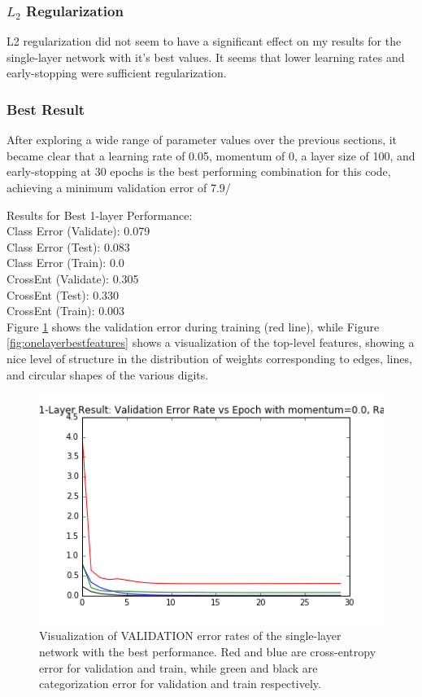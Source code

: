 \documentclass{article}
\begin{document}
\subsubsection*{$L_2$ Regularization}
L2 regularization did not seem to have a significant effect on my results for the single-layer network with it's best values. It seems that lower learning rates and early-stopping were sufficient regularization. 

\subsubsection*{Best Result}
After exploring a wide range of parameter values over the previous sections, it became clear that a learning rate of 0.05, momentum of 0, a layer size of 100, and early-stopping at 30 epochs is the best performing combination for this code, achieving a minimum validation error of 7.9/%

Results for Best 1-layer Performance:\\
Class Error (Validate): 0.079\\
Class Error (Test):		0.083\\
Class Error (Train):	0.0\\
CrossEnt (Validate):	0.305\\
CrossEnt (Test):		0.330\\
CrossEnt (Train): 		0.003\\

Figure \ref{fig:onelayerbest} shows the validation error during training (red line), while Figure \ref{fig:onelayerbestfeatures} shows a visualization of the top-level features, showing a nice level of structure in the distribution of weights corresponding to edges, lines, and circular shapes of the various digits. 



\begin{figure}[h]
  \centering
  \includegraphics[scale=0.6]{../one_layer_best.png} 
  \caption{Visualization of VALIDATION error rates of the single-layer network with the best performance. Red and blue are cross-entropy error for validation and train, while green and black are categorization error for validation and train respectively. }
  \label{fig:onelayerbest}
\end{figure}
\end{document}

